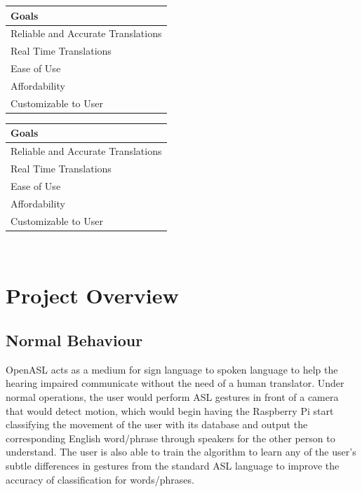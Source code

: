 \documentclass[12pt, titlepage]{article}
\begin{document}
\begin{center}
\begin{tabular}{ | m{18em} | } 
  \hline
  Goals\\ 
  \hline
  Reliable and Accurate Translations\\ 
  \hline
  Real Time Translations\\ 
  \hline
  Ease of Use\\
  \hline
  Affordability\\
  \hline
  Customizable to User\\
  \hline
\end{tabular}
\end{center}

\begin{center}
\begin{tabular} {m{18em}}
  \toprule		
  \textbf{Goals}\\
  \midrule 
  Reliable and Accurate Translations\\
  \hline
  Real Time Translations\\ 
  \hline
  Ease of Use\\
  \hline
  Affordability\\
  \hline
  Customizable to User\\
  \bottomrule
\end{tabular}\\
\end{center}
\section{Project Overview}

\subsection{Normal Behaviour}
OpenASL acts as a medium for sign language to spoken language to help the hearing impaired communicate without the need of a human translator. 
Under normal operations, the user would perform ASL gestures in front of a camera that would detect motion, which would begin having the Raspberry Pi 
start classifying the movement of the user with its database and output the corresponding English word/phrase through speakers for the other person to 
understand. The user is also able to train the algorithm to learn any of the user’s subtle differences in gestures from the standard ASL language to 
improve the accuracy of classification for words/phrases.
\end{document}
